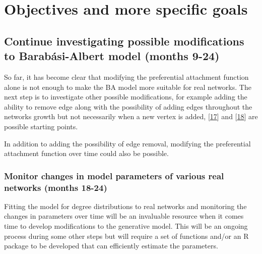 \documentclass[
  10pt,
  a4paper,
]{scrreprt}
\theoremstyle{plain}
\theoremstyle{definition}
\theoremstyle{plain}
\theoremstyle{remark}
\begin{document}
{\hypertarget{objectives-and-more-specific-goals}{%
\section{Objectives and more specific
goals}\label{objectives-and-more-specific-goals}}

\hypertarget{continue-investigating-possible-modifications-to-barabuxe1si-albert-model-months-9-24}{%
\subsection*{Continue investigating possible modifications to
Barabási-Albert model (months
9-24)}\label{continue-investigating-possible-modifications-to-barabuxe1si-albert-model-months-9-24}}

So far, it has become clear that modifying the preferential attachment
function alone is not enough to make the BA model more suitable for real
networks. The next step is to investigate other possible modifications,
for example adding the ability to remove edge along with the possibility
of adding edges throughout the networks growth but not necessarily when
a new vertex is added, {[}\protect\hyperlink{ref-lu04}{17}{]} and
{[}\protect\hyperlink{ref-moore06}{18}{]} are possible starting points.

In addition to adding the possibility of edge removal, modifying the
preferential attachment function over time could also be possible.

\hypertarget{monitor-changes-in-model-parameters-of-various-real-networks-months-18-24}{%
\subsubsection*{Monitor changes in model parameters of various real
networks (months
18-24)}\label{monitor-changes-in-model-parameters-of-various-real-networks-months-18-24}}

Fitting the model for degree distributions to real networks and
monitoring the changes in parameters over time will be an invaluable
resource when it comes time to develop modifications to the generative
model. This will be an ongoing process during some other steps but will
require a set of functions and/or an R package to be developed that can
efficiently estimate the parameters.

}
\end{document}
